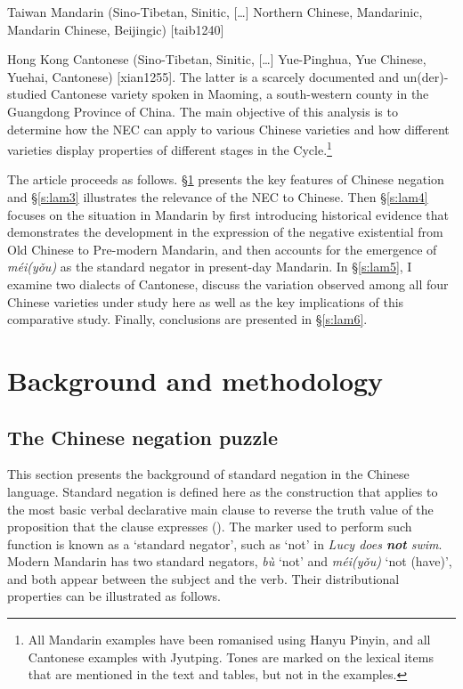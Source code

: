 \documentclass[output=paper]{langscibook}
\begin{document}
Taiwan Mandarin (Sino-Tibetan, Sinitic, […] Northern Chinese, Mandarinic, Mandarin Chinese, Beijingic) [taib1240]

Hong Kong Cantonese (Sino-Tibetan, Sinitic, […] Yue-Pinghua, Yue Chinese, Yuehai, Cantonese) [xian1255].
The latter is a scarcely documented and un(der)-studied Cantonese variety spoken in Maoming, a south-western county in the Guangdong Province of China. The main objective of this analysis is to determine how the NEC can apply to various Chinese varieties and how different varieties display properties of different stages in the Cycle.\footnote{All Mandarin examples have been romanised using Hanyu Pinyin, and all Cantonese examples with Jyutping. Tones are marked on the lexical items that are mentioned in the text and tables, but not in the examples.} 

The article proceeds as follows. §\ref{s:lam2} presents the key features of Chinese negation and §\ref{s:lam3} illustrates the relevance of the NEC to Chinese. Then §\ref{s:lam4} focuses on the situation in Mandarin by first introducing historical evidence that demonstrates the development in the expression of the negative existential from Old Chinese to Pre-modern Mandarin, and then accounts for the emergence of \textit{méi(yǒu)} as the standard negator in present-day Mandarin. In §\ref{s:lam5}, I examine two dialects of Cantonese, discuss the variation observed among all four Chinese varieties under study here as well as the key implications of this comparative study. Finally, conclusions are presented in §\ref{s:lam6}. 

\section{Background and methodology}\label{s:lam2}
\subsection{The Chinese negation puzzle}\label{s:lam2-1}

This section presents the background of standard negation in the Chinese language. Standard negation is defined here as the construction that applies to the most basic verbal declarative main clause to reverse the truth value of the proposition that the clause expresses (\citealt{Miestamo2005}). The marker used to perform such function is known as a `standard negator', such as `not' in \textit{Lucy does \textbf{not} swim}. Modern Mandarin has two standard negators, \textit{bù} `not' and \textit{méi(yǒu)} `not (have)', and both appear between the subject and the verb. Their distributional properties can be illustrated as follows. 
\end{document}
